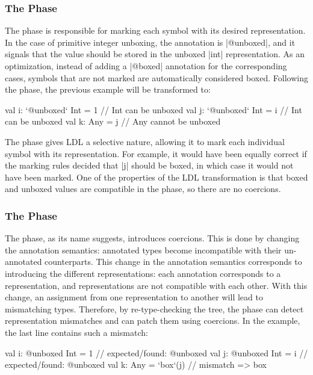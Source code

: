 \subsubsection*{The \Inject{} Phase}

The \inject{} phase is responsible for marking each symbol with its desired representation. In the case of primitive integer unboxing, the annotation is |@unboxed|, and it signals that the value should be stored in the unboxed |int| representation. As an optimization, instead of adding a |@boxed| annotation for the corresponding cases, symbols that are not marked are automatically considered boxed. Following the \inject{} phase, the previous example will be transformed to:


\begin{lstlisting-nobreak}
val i: `@unboxed` Int = 1 // Int can be unboxed
val j: `@unboxed` Int = i // Int can be unboxed
val k: Any = j                  // Any cannot be unboxed
\end{lstlisting-nobreak}


The \inject{} phase gives LDL a selective nature, al\-low\-ing it to mark
each individual symbol with its representation. For example, it would
have been equally correct if the marking rules decided that |j| should
be boxed, in which case it would not have been marked. One of
the properties of the LDL transformation is that boxed and unboxed
values are compatible in the \inject{} phase, so there are no coercions.


\subsubsection*{The \Coerce{} Phase}

The \coerce{} phase, as its name suggests, introduces coercions. This is done by changing the annotation semantics: annotated types become incompatible with their un-annotated counterparts. This change in the annotation semantics corresponds to introducing the different representations: each annotation corresponds to a representation, and representations are not compatible with each other. With this change, an assignment from one representation to another will lead to mismatching types. Therefore, by re-type-checking the tree, the \coerce{} phase can detect representation mismatches and can patch them using coercions. In the example, the last line contains such a mismatch:

\begin{lstlisting-nobreak}
val i: @unboxed Int = 1 // expected/found: @unboxed
val j: @unboxed Int = i // expected/found: @unboxed
val k: Any = `box`(j)             // mismatch => box
\end{lstlisting-nobreak}

